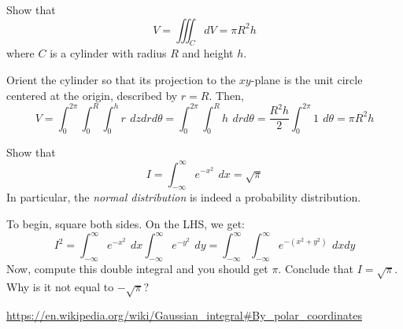 \documentclass[addpoints]{exam}
\begin{document}
\printanswers
\begin{questions}
\question Show that 
\[
V = \iiint _ C dV = \pi R^2 h
\]
where $C$ is a cylinder with radius $R$ and height $h$. 
\begin{solution}
Orient the cylinder so that its projection to the $xy$-plane is the unit circle centered at the origin, described by $r = R$. Then, 
\[
V = \int _0 ^{2\pi} \int_0^R \int_0^h r \, \ dz dr d \theta =  \int _0 ^{2\pi} \int_0^R h \, \ dr d \theta =  \frac{R^2 h}{2} \int _0 ^{2\pi} 1 \, \ d \theta = \pi R^2 h
\]
\end{solution}


\question[30] Show that 
\[
I = \int_{-\infty}^{\infty} e^{-x^2} \, \ dx = \sqrt{\pi}
\]
In particular, the \textit{normal distribution} is indeed a probability distribution. 

To begin, square both sides. On the LHS, we get:
\[
I^2 =  \int_{-\infty}^{\infty} e^{-x^2} \, \ dx  \int_{-\infty}^{\infty} e^{-y^2} \, \ dy =  \int_{-\infty}^{\infty}\int_{-\infty}^{\infty} e^{-(x^2 + y^2)} \, \ dx dy 
\]
Now, compute this double integral and you should get $\pi$. Conclude that $I = \sqrt{\pi}$. Why is it not equal to $- \sqrt{\pi}$?
\begin{solution}
\url{https://en.wikipedia.org/wiki/Gaussian_integral#By_polar_coordinates}
\end{solution}

\end{questions}
\end{document}
